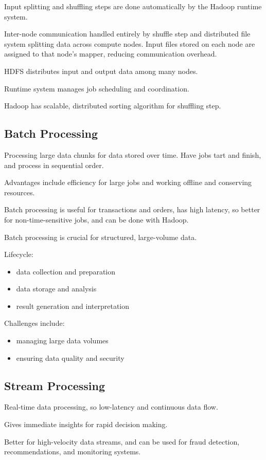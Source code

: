 \documentclass[11pt]{article}
\begin{document}
Input splitting and shuffling steps are done automatically by the
Hadoop runtime system.

Inter-node communication handled entirely by shuffle step
and distributed file system splitting data across compute nodes.
Input files stored on each node are assigned to that node's mapper,
reducing communication overhead.

HDFS distributes input and output data among many nodes.

Runtime system manages job scheduling and coordination.

Hadoop has scalable, distributed sorting algorithm for
shuffling step.
\subsection{Batch Processing}
\label{sec:org1de0fa2}
Processing large data chunks for data stored over time.
Have jobs tart and finish, and process in sequential order.

Advantages include efficiency for large jobs and working offline
and conserving resources.

Batch processing is useful for transactions and orders, has
high latency, so better for non-time-sensitive jobs, and can be
done with Hadoop.

Batch processing is crucial for structured, large-volume data.

Lifecycle:
\begin{itemize}
\item data collection and preparation
\item data storage and analysis
\item result generation and interpretation
\end{itemize}

Challenges include:
\begin{itemize}
\item managing large data volumes
\item ensuring data quality and security
\end{itemize}
\subsection{Stream Processing}
\label{sec:orgcddecdb}
Real-time data processing, so low-latency and continuous data flow.

Gives immediate insights for rapid decision making.

Better for high-velocity data streams, and can be used for fraud detection,
recommendations, and monitoring systems.
\end{document}
